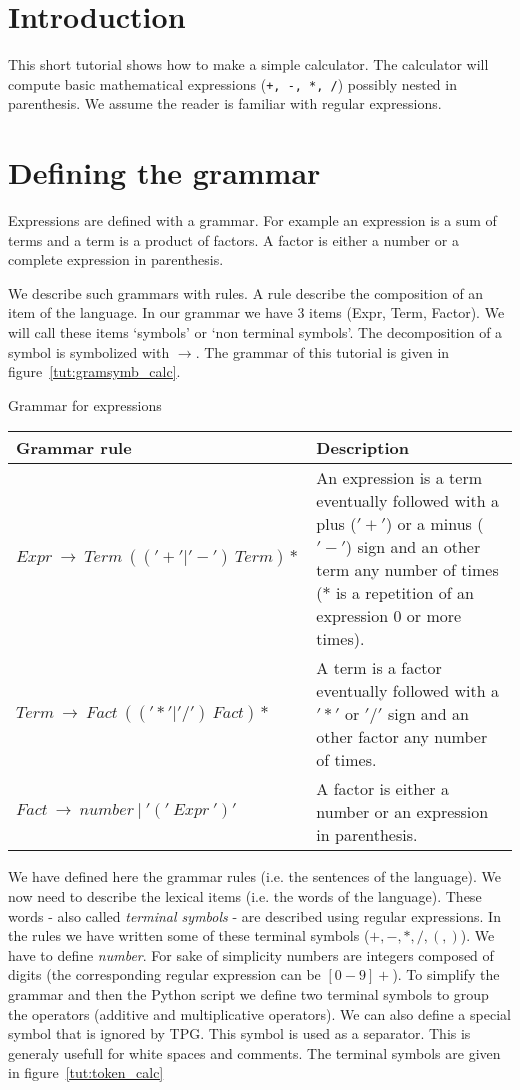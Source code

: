 \section{Introduction}

This short tutorial shows how to make a simple calculator.
The calculator will compute basic mathematical expressions (\verb|+, -, *, /|) possibly nested in parenthesis.
We assume the reader is familiar with regular expressions.

\section{Defining the grammar}

Expressions are defined with a grammar.
For example an expression is a sum of terms and a term is a product of factors. A factor is either a number or a complete expression in parenthesis.

We describe such grammars with rules. A rule describe the composition of an item of the language. In our grammar we have 3 items (Expr, Term, Factor). We will call these items `symbols' or `non terminal symbols'. The decomposition of a symbol is symbolized with $\to$.
The grammar of this tutorial is given in figure~\ref{tut:gramsymb_calc}.

\begin{tableau}
\caption{Grammar for expressions}                           \label{tut:gramsymb_calc}
\begin{tabular}{| l | p{7cm} |}
\hline
    Grammar rule & Description \\
\hline
\hline
    $Expr~\to~Term~(('+'|'-')~Term)*$
        & An expression is a term eventually followed with a plus ($'+'$) or a minus ($'-'$) sign and an other term any number of times ($*$ is a repetition of an expression 0 or more times). \\
\hline
    $Term~\to~Fact~(('*'|'/')~Fact)*$
        & A term is a factor eventually followed with a $'*'$ or $'/'$ sign and an other factor any number of times. \\
\hline
    $Fact~\to~number~|~'('~Expr~')'$
        & A factor is either a number or an expression in parenthesis. \\
\hline
\end{tabular}
\end{tableau}

We have defined here the grammar rules (i.e. the sentences of the language). We now need to describe the lexical items (i.e. the words of the language). These words - also called \emph{terminal symbols} - are described using regular expressions. In the rules we have written some of these terminal symbols ($+, -, *, /, (, )$). We have to define \emph{number}. For sake of simplicity numbers are integers composed of digits (the corresponding regular expression can be $[0-9]+$).
To simplify the grammar and then the Python script we define two terminal symbols to group the operators (additive and multiplicative operators). We can also define a special symbol that is ignored by TPG. This symbol is used as a separator. This is generaly usefull for white spaces and comments. The terminal symbols are given in figure~\ref{tut:token_calc}

